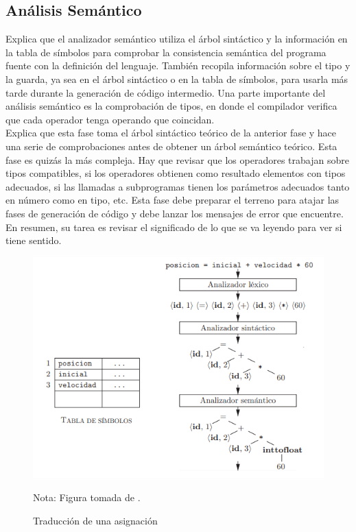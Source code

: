 \subsection{Análisis Semántico}
\cite{aho2008compiladores} Explica que el analizador semántico utiliza el árbol sintáctico y la información en la tabla de símbolos para comprobar la consistencia semántica del programa fuente con la definición del lenguaje. También recopila información sobre el tipo y la guarda, ya sea en el árbol sintáctico o en la tabla de símbolos, para usarla más tarde durante la generación de código intermedio.
Una parte importante del análisis semántico es la comprobación de tipos, en donde el compilador verifica que cada operador tenga operando que coincidan.\\

\cite{catalan2010compiladores} Explica que esta fase toma el árbol sintáctico teórico de la anterior fase y hace una serie de comprobaciones antes de obtener un árbol semántico teórico.
Esta fase es quizás la más compleja. Hay que revisar que los operadores trabajan sobre tipos compatibles, si los operadores obtienen como resultado elementos con tipos adecuados, si las llamadas a subprogramas tienen los parámetros adecuados tanto en
número como en tipo, etc. Esta fase debe preparar el terreno para atajar las fases de generación de código y debe lanzar los mensajes de error que encuentre. En resumen, su tarea es revisar el significado de lo que se va leyendo para ver si tiene sentido.

\begin{figure}[ht!]
\centering
\includegraphics[scale=0.9]{imagenes/traduccionDeAsignacion1}
\caption{Traducción de una asignación}
Nota: Figura tomada de \cite{aho2008compiladores}.
\label{traduccion1}
\end{figure}

